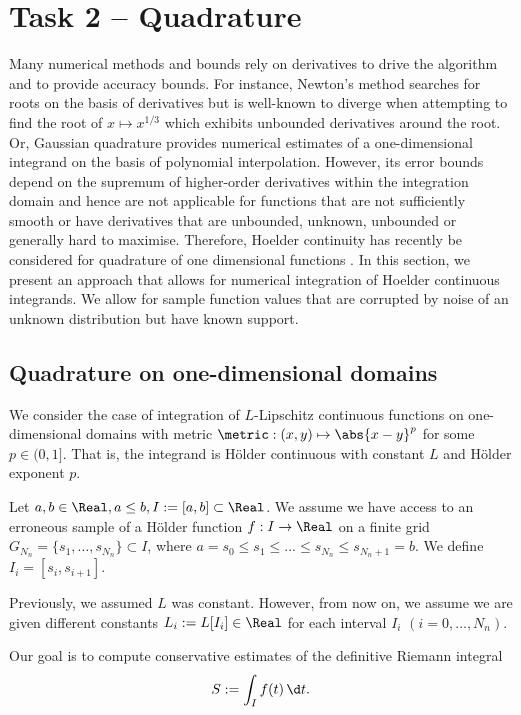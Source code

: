 \section{Task 2 -- Quadrature}
\label{sec:quadr}

Many numerical methods and bounds rely on derivatives to drive the algorithm and to provide accuracy bounds. For instance, Newton's method searches for roots on the basis of derivatives but is well-known to diverge when attempting to find the root of $x \mapsto x^{1/3}$ which exhibits unbounded derivatives around the root. Or, Gaussian quadrature provides numerical estimates of a one-dimensional integrand on the basis of polynomial interpolation. However, its error bounds depend on the supremum of higher-order derivatives  within the integration domain and hence are not applicable for functions that are not sufficiently smooth or have derivatives that are unbounded, unknown, unbounded or generally hard to maximise. 
Therefore, Hoelder continuity has recently be considered for quadrature of one dimensional functions \cite{Baran2008}. In this section, we present an approach that allows for numerical integration of Hoelder continuous integrands. We allow for sample function values that are corrupted by noise of an unknown distribution but have known support.

\subsection{Quadrature on one-dimensional domains}
\label{sec:quadr_1dim} 

We consider the case of integration of $L$-Lipschitz continuous functions on one-dimensional domains with metric $\metric: (x,y) \mapsto \abs{x-y}^p$ for some $p \in (0,1]$. That is, the integrand is H\"older continuous with constant $L$ and H\"older exponent $p$.

Let $a,b \in \Real, a \leq b, I := [a,b] \subset \Real$.
We assume we have access to an erroneous sample of a H\"older function $f: I \to \Real $ on a finite grid $G_{N_n} =\{s_1,\ldots,s_{N_n}\} \subset I$, where $a = s_0 \leq s_1 \leq ...\leq s_{N_n}\leq s_{{N_n}+1} =b$. We define $I_i = [s_i,s_{i+1}]$.

Previously, we assumed $L$ was constant. However, from now on, we assume we are given different constants $L_i := L[I_i] \in \Real$ for each interval $I_i$ $(i = 0,\ldots,{N_n})$.  

Our goal is to compute conservative estimates of the definitive Riemann integral \[S := \int_{I} f(t) \, \d t.\] 


